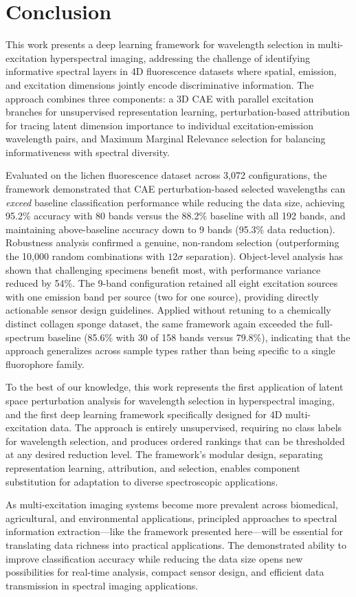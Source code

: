 \section{Conclusion}
\label{sec:conclusion}

This work presents a deep learning framework for wavelength selection in multi-excitation hyperspectral imaging, addressing the challenge of identifying informative spectral layers in 4D fluorescence datasets where spatial, emission, and excitation dimensions jointly encode discriminative information.
The approach combines three components: a 3D CAE with parallel excitation branches for unsupervised representation learning, perturbation-based attribution for tracing latent dimension importance to individual excitation-emission wavelength pairs, and Maximum Marginal Relevance selection for balancing informativeness with spectral diversity.

Evaluated on the lichen fluorescence dataset across 3,072 configurations, the framework demonstrated that CAE perturbation-based selected wavelengths can \emph{exceed} baseline classification performance while reducing the data size, achieving 95.2\% accuracy with 80 bands versus the 88.2\% baseline with all 192 bands, and maintaining above-baseline accuracy down to 9 bands (95.3\% data reduction).
Robustness analysis confirmed a genuine, non-random selection (outperforming the 10,000 random combinations with $12\sigma$ separation). Object-level analysis has shown that challenging specimens benefit most, with performance variance reduced by 54\%.
The 9-band configuration retained all eight excitation sources with one emission band per source (two for one source), providing directly actionable sensor design guidelines.
Applied without retuning to a chemically distinct collagen sponge dataset, the same framework again exceeded the full-spectrum baseline (85.6\% with 30 of 158 bands versus 79.8\%), indicating that the approach generalizes across sample types rather than being specific to a single fluorophore family.

To the best of our knowledge, this work represents the first application of latent space perturbation analysis for wavelength selection in hyperspectral imaging, and the first deep learning framework specifically designed for 4D multi-excitation data.
The approach is entirely unsupervised, requiring no class labels for wavelength selection, and produces ordered rankings that can be thresholded at any desired reduction level.
The framework's modular design, separating representation learning, attribution, and selection, enables component substitution for adaptation to diverse spectroscopic applications.

As multi-excitation imaging systems become more prevalent across biomedical, agricultural, and environmental applications, principled approaches to spectral information extraction---like the framework presented here---will be essential for translating data richness into practical applications.
The demonstrated ability to improve classification accuracy while reducing the data size opens new possibilities for real-time analysis, compact sensor design, and efficient data transmission in spectral imaging applications.